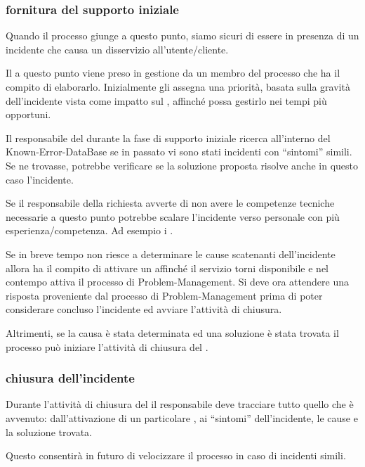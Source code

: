 \subsubsection[Fornitura del supporto iniziale]{fornitura del supporto iniziale}
Quando il processo giunge a questo punto, siamo sicuri di essere in presenza di un incidente che causa un disservizio all'utente/cliente. 

Il  a questo punto viene preso in gestione da un membro del processo che ha il compito di elaborarlo. Inizialmente gli assegna una priorità, basata sulla gravità dell'incidente vista come impatto sul , affinché possa gestirlo nei tempi più opportuni.

Il responsabile del  durante la fase di supporto iniziale ricerca all'interno del \ac{Known-Error-DataBase} se in passato vi sono stati incidenti con ``sintomi'' simili. Se ne trovasse, potrebbe verificare se la soluzione proposta risolve anche in questo caso l'incidente.

Se il responsabile della richiesta avverte di non avere le competenze tecniche necessarie a questo punto potrebbe scalare l'incidente verso personale con più esperienza/competenza. Ad esempio i .

Se in breve tempo non riesce a determinare le cause scatenanti dell'incidente allora ha il compito di attivare un  affinché il servizio torni disponibile e nel contempo attiva il processo di \ac{Problem-Management}. Si deve ora attendere una risposta proveniente dal processo di \ac{Problem-Management} prima di poter considerare concluso l'incidente ed avviare l'attività di chiusura.

Altrimenti, se la causa è stata determinata ed una soluzione è stata trovata il processo può iniziare l'attività di chiusura del .

\subsubsection[Chiusura dell'incidente]{chiusura dell'incidente}
Durante l'attività di chiusura del  il responsabile deve tracciare tutto quello che è avvenuto: dall'attivazione di un particolare , ai ``sintomi'' dell'incidente, le cause e la soluzione trovata.

Questo consentirà in futuro di velocizzare il processo in caso di incidenti simili.

